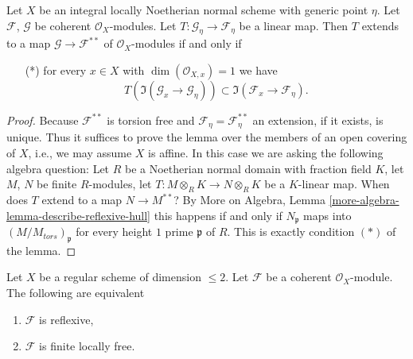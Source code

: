 \begin{lemma}
\label{lemma-describe-reflexive-hull}
Let $X$ be an integral locally Noetherian normal scheme with
generic point $\eta$. Let $\mathcal{F}$, $\mathcal{G}$ be coherent
$\mathcal{O}_X$-modules. Let $T : \mathcal{G}_\eta \to \mathcal{F}_\eta$
be a linear map. Then $T$ extends to a map
$\mathcal{G} \to \mathcal{F}^{**}$ of $\mathcal{O}_X$-modules
if and only if
\begin{itemize}
\item[(*)] for every $x \in X$ with $\dim(\mathcal{O}_{X, x}) = 1$
we have
$$
T\left(\Im(\mathcal{G}_x \to \mathcal{G}_\eta)\right) \subset
\Im(\mathcal{F}_x \to \mathcal{F}_\eta).
$$
\end{itemize}
\end{lemma}

\begin{proof}
Because $\mathcal{F}^{**}$ is torsion free and
$\mathcal{F}_\eta = \mathcal{F}^{**}_\eta$ an extension, if it exists,
is unique. Thus it suffices to prove the lemma over the members of an
open covering of $X$, i.e., we may assume $X$ is affine. In this case
we are asking the following algebra question: Let $R$ be a Noetherian
normal domain with fraction field $K$, let $M$, $N$ be finite $R$-modules,
let $T : M \otimes_R K \to N \otimes_R K$ be a $K$-linear map. When
does $T$ extend to a map $N \to M^{**}$? By More on Algebra, Lemma
\ref{more-algebra-lemma-describe-reflexive-hull}
this happens if and only if $N_\mathfrak p$ maps into
$(M/M_{tors})_\mathfrak p$ for every height $1$ prime $\mathfrak p$ of $R$.
This is exactly condition $(*)$ of the lemma.
\end{proof}

\begin{lemma}
\label{lemma-reflexive-over-regular-dim-2}
Let $X$ be a regular scheme of dimension $\leq 2$.
Let $\mathcal{F}$ be a coherent $\mathcal{O}_X$-module.
The following are equivalent
\begin{enumerate}
\item $\mathcal{F}$ is reflexive,
\item $\mathcal{F}$ is finite locally free.
\end{enumerate}
\end{lemma}

